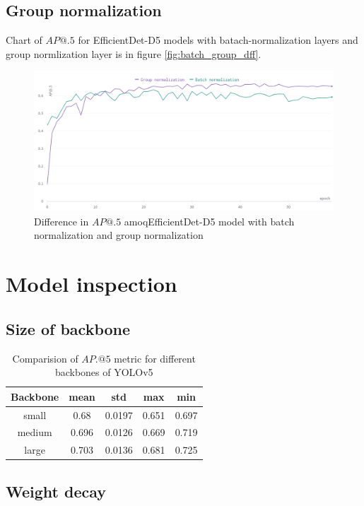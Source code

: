 \subsection{Group normalization}
Chart of $AP@.5$ for EfficientDet-D5 models with batach-normalization layers and group normlization layer is in figure \ref{fig:batch_group_dff}.
\begin{figure}[H]
    \centering
    \includegraphics[width=\textwidth]{images/batch_norm_group_norm.png}
    \caption{Difference in $AP@.5$ amoqEfficientDet-D5 model with batch normalization and group normalization}
    \label{fig:batch_group_diff}
\end{figure}

\section{Model inspection}
\subsection{Size of backbone}
\begin{table}[H]
    \begin{tabular}{|c|c|c|c|c|}
        \hline
        Backbone & mean  & std    & max   & min   \\ \hline
        small    & 0.68  & 0.0197 & 0.651 & 0.697 \\ \hline
        medium   & 0.696 & 0.0126 & 0.669 & 0.719 \\ \hline
        large    & 0.703 & 0.0136 & 0.681 & 0.725 \\ \hline
    \end{tabular}
    \caption{Comparision of $AP.@5$ metric for different backbones of YOLOv5}
    \label{tab:backbone_comparison}
\end{table}

\subsection{Weight decay}

